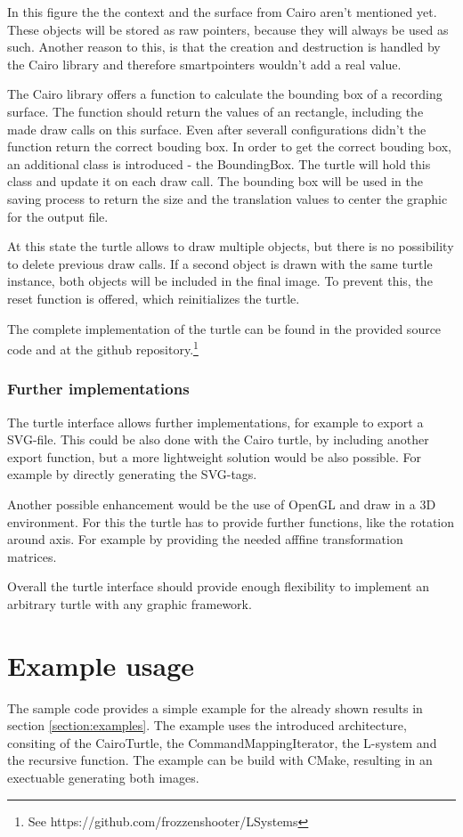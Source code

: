 \documentclass[english]{cpp-hmwk}
\begin{document}
\noindent In this figure the the context and the surface from Cairo aren't mentioned yet. These objects will be stored as raw pointers, because they will always be used as such. Another reason to this, is that the creation and destruction is handled by the Cairo library and therefore smartpointers wouldn't add a real value.\newline

\noindent The Cairo library offers a function to calculate the bounding box of a recording surface. The function should return the values of an rectangle, including the made draw calls on this surface. Even after severall configurations didn't the function return the correct bouding box. In order to get the correct bouding box, an additional class is introduced - the BoundingBox. The turtle will hold this class and update it on each draw call. The bounding box will be used in the saving process to return the size and the translation values to center the graphic for the output file.

\noindent At this state the turtle allows to draw multiple objects, but there is no possibility to delete previous draw calls. If a second object is drawn with the same turtle instance, both objects will be included in the final image. To prevent this, the reset function is offered, which reinitializes the turtle.

The complete implementation of the turtle can be found in the provided source code and at the github repository.\footnote{See https://github.com/frozzenshooter/LSystems}

\subsubsection{Further implementations}
The turtle interface allows further implementations, for example to export a SVG-file. This could be also done with the Cairo turtle, by including another export function, but a more lightweight solution would be also possible. For example by directly generating the SVG-tags. 

Another possible enhancement would be the use of OpenGL and draw in a 3D environment. For this the turtle has to provide further functions, like the rotation around axis. For example by providing the needed afffine transformation matrices.

Overall the turtle interface should provide enough flexibility to implement an arbitrary turtle with any graphic framework.

\section{Example usage}
The sample code provides a simple example for the already shown results in section \ref{section:examples}. The example uses the introduced architecture, consiting of the CairoTurtle, the CommandMappingIterator, the L-system and the recursive function. The example can be build with CMake, resulting in an exectuable generating both images. 
\end{document}
